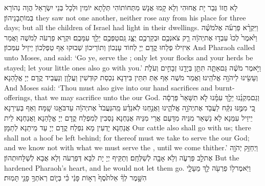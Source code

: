 {לָא חֲזוֹ גְּבַר יָת אֲחוּהִי וְלָא קָמוּ אֲנָשׁ מִתְּחוֹתוֹהִי תְּלָתָא יוֹמִין וּלְכָל בְּנֵי יִשְׂרָאֵל הֲוָה נְהוֹרָא בְּמוֹתְבָנֵיהוֹן׃}
{they saw not one another, neither rose any from his place for three days; but all the children of Israel had light in their dwellings.}{}
{וַיִּקְרָ֨א פַרְעֹ֜ה אֶל\maqqaf מֹשֶׁ֗ה וַיֹּ֙אמֶר֙ לְכוּ֙ עִבְד֣וּ אֶת\maqqaf יְהֹוָ֔ה רַ֛ק צֹאנְכֶ֥ם וּבְקַרְכֶ֖ם יֻצָּ֑ג גַּֽם\maqqaf טַפְּכֶ֖ם יֵלֵ֥ךְ עִמָּכֶֽם׃}
{וּקְרָא פַרְעֹה לְמֹשֶׁה וַאֲמַר אִיזִילוּ פְלַחוּ קֳדָם יְיָ לְחוֹד עָנְכוֹן וְתוֹרֵיכוֹן שְׁבוּקוּ אַף טַפְלְכוֹן יֵיזֵיל עִמְּכוֹן׃}
{And Pharaoh called unto Moses, and said: ‘Go ye, serve the \lord; only let your flocks and your herds be stayed; let your little ones also go with you.’}{}
{וַיֹּ֣אמֶר מֹשֶׁ֔ה גַּם\maqqaf אַתָּ֛ה תִּתֵּ֥ן בְּיָדֵ֖נוּ זְבָחִ֣ים וְעֹלֹ֑ת וְעָשִׂ֖ינוּ לַיהֹוָ֥ה אֱלֹהֵֽינוּ׃}
{וַאֲמַר מֹשֶׁה אַף אַתְּ תִּתֵּין בִּידַנָא נִכְסַת קוּדְשִׁין וַעֲלָוָן וְנַעֲבֵיד קֳדָם יְיָ אֱלָהַנָא׃}
{And Moses said: ‘Thou must also give into our hand sacrifices and burnt-offerings, that we may sacrifice unto the \lord\space our God.}{}
{וְגַם\maqqaf מִקְנֵ֜נוּ יֵלֵ֣ךְ עִמָּ֗נוּ לֹ֤א תִשָּׁאֵר֙ פַּרְסָ֔ה כִּ֚י מִמֶּ֣נּוּ נִקַּ֔ח לַעֲבֹ֖ד אֶת\maqqaf יְהֹוָ֣ה אֱלֹהֵ֑ינוּ וַאֲנַ֣חְנוּ לֹֽא\maqqaf נֵדַ֗ע מַֽה\maqqaf נַּעֲבֹד֙ אֶת\maqqaf יְהֹוָ֔ה עַד\maqqaf בֹּאֵ֖נוּ שָֽׁמָּה׃}
{וְאַף בְּעִירַנָא יֵיזֵיל עִמַּנָא לָא נַשְׁאַר מִנֵּיהּ מִדָּעַם אֲרֵי מִנֵּיהּ אֲנַחְנָא נָסְבִין לְמִפְלַח קֳדָם יְיָ אֱלָהַנָא וַאֲנַחְנָא לֵית אֲנַחְנָא יָדְעִין מָא נִפְלַח קֳדָם יְיָ עַד מֵיתַנָא לְתַמָּן׃}
{Our cattle also shall go with us; there shall not a hoof be left behind; for thereof must we take to serve the \lord\space our God; and we know not with what we must serve the \lord, until we come thither.’}{}
{וַיְחַזֵּ֥ק יְהֹוָ֖ה אֶת\maqqaf לֵ֣ב פַּרְעֹ֑ה וְלֹ֥א אָבָ֖ה לְשַׁלְּחָֽם׃}
{וְתַקֵּיף יְיָ יָת לִבָּא דְּפַרְעֹה וְלָא אֲבָא לְשַׁלָּחוּתְהוֹן׃}
{But the \lord\space hardened Pharaoh’s heart, and he would not let them go.}{}
{וַיֹּֽאמֶר\maqqaf ל֥וֹ פַרְעֹ֖ה לֵ֣ךְ מֵעָלָ֑י הִשָּׁ֣מֶר לְךָ֗ אַל\maqqaf תֹּ֙סֶף֙ רְא֣וֹת פָּנַ֔י כִּ֗י בְּי֛וֹם רְאֹתְךָ֥ פָנַ֖י תָּמֽוּת׃}
